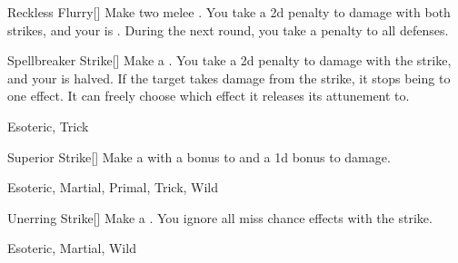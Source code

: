\lowercase{\hypertarget{maneuver:Reckless Flurry}{}}\label{maneuver:Reckless Flurry}
\hypertarget{maneuver:Reckless Flurry}{}
\begin{freeability}[Rank 5]{Reckless Flurry}[]
Make two melee .
You take a \minus2d penalty to damage with both strikes, and your  is .
During the next round, you take a  penalty to all defenses.


\end{freeability}
\vspace{0.25em}



\lowercase{\hypertarget{maneuver:Spellbreaker Strike}{}}\label{maneuver:Spellbreaker Strike}
\hypertarget{maneuver:Spellbreaker Strike}{}
\begin{freeability}[Rank 5]{Spellbreaker Strike}[]
Make a .
You take a \minus2d penalty to damage with the strike, and your  is halved.
If the target takes damage from the strike, it stops being  to one effect.
It can freely choose which effect it releases its attunement to.


 Esoteric, Trick
\end{freeability}
\vspace{0.25em}



\lowercase{\hypertarget{maneuver:Superior Strike}{}}\label{maneuver:Superior Strike}
\hypertarget{maneuver:Superior Strike}{}
\begin{freeability}[Rank 5]{Superior Strike}[]
Make a  with a  bonus to  and a \plus1d bonus to damage.


 Esoteric, Martial, Primal, Trick, Wild
\end{freeability}
\vspace{0.25em}



\lowercase{\hypertarget{maneuver:Unerring Strike}{}}\label{maneuver:Unerring Strike}
\hypertarget{maneuver:Unerring Strike}{}
\begin{freeability}[Rank 5]{Unerring Strike}[]
Make a .
You ignore all miss chance effects with the strike.


 Esoteric, Martial, Wild
\end{freeability}
\vspace{0.25em}


